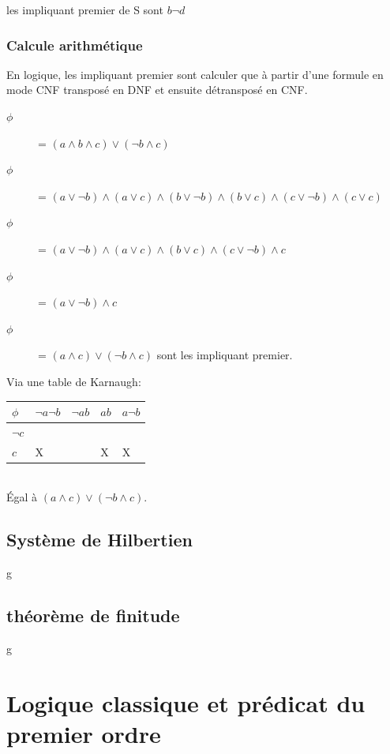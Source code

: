 les impliquant premier de S sont $b \neg d$\\

\subsection{Calcule arithmétique}
En logique, les impliquant premier sont calculer que à partir d'une formule en mode CNF transposé en DNF et ensuite détransposé en CNF.

\begin{description}
\item[$\phi$] = $(a \wedge b \wedge c) \vee ( \neg b \wedge c)$
\item[$\phi$] = $(a \vee \neg b) \wedge (a \vee c) \wedge ( b \vee \neg b) \wedge (b \vee c) \wedge (c \vee  \neg b ) \wedge (c \vee c)$
\item[$\phi$] = $(a \vee \neg b) \wedge (a \vee c) \wedge (b \vee c) \wedge (c \vee \neg b) \wedge c$
\item[$\phi$] = $(a \vee \neg b) \wedge c$
\item[$\phi$] = $(a \wedge c) \vee (\neg b \wedge c)$ sont les impliquant premier.
\end{description}

Via une table de Karnaugh:\\
\begin{center}
\begin{tabular}{l|l|l|l|l}
  \hline
  $\phi$ & $\neg a \neg b$ & $\neg a b$ & $ab$ & $a \neg b$\\
  \hline
  $\neg c$ & $ $ & $ $ & $ $ & $ $ \\
  $c$ & X & $ $ & X & X \\
  \hline
\end{tabular}\\
Égal à $(a \wedge c) \vee (\neg b \wedge c)$.
\end{center}

\section{Système de Hilbertien}

g

\section{théorème de finitude}

g

\chapter{Logique classique et prédicat du premier ordre}
